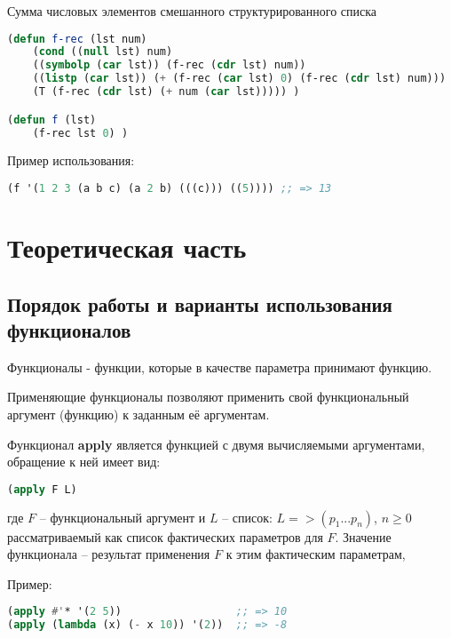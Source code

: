 \documentclass[a4paper,oneside,12pt]{extreport}
\begin{document}
\begin{task}
    Сумма числовых элементов смешанного структурированного списка
    \begin{lstlisting}[language=Lisp] 
(defun f-rec (lst num)
	(cond ((null lst) num)
	((symbolp (car lst)) (f-rec (cdr lst) num))
	((listp (car lst)) (+ (f-rec (car lst) 0) (f-rec (cdr lst) num)))
	(T (f-rec (cdr lst) (+ num (car lst))))) )

(defun f (lst)
	(f-rec lst 0) )   
    \end{lstlisting}

    Пример использования:
    \begin{lstlisting}[language=Lisp]    
(f '(1 2 3 (a b c) (a 2 b) (((c))) ((5)))) ;; => 13
    \end{lstlisting}
\end{task}


\newpage

\section*{Теоретическая часть}

\subsection*{Порядок работы и варианты использования функционалов}

Функционалы - функции, которые в качестве параметра принимают функцию.

Применяющие функционалы позволяют применить свой функциональный аргумент (функцию) к заданным её аргументам.

Функционал \textbf{apply} является функцией с двумя вычисляемыми аргументами, обращение к ней имеет вид: 

\begin{lstlisting}[language=Lisp] 
    (apply F L)
\end{lstlisting}

где $F$ – функциональный аргумент и $L$ – список: $L =>(p_1 ... p_n )$, $n \geq 0$
рассматриваемый как список фактических параметров для $F$. Значение
функционала – результат применения $F$ к этим фактическим параметрам,

Пример:
\begin{lstlisting}[language=Lisp] 
(apply #'* '(2 5))                  ;; => 10
(apply (lambda (x) (- x 10)) '(2))  ;; => -8    
\end{lstlisting}
\end{document}
